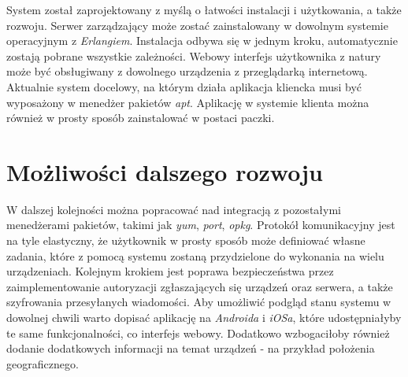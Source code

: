 \documentclass[polish,12pt]{aghthesis}
\begin{document}
System został zaprojektowany z myślą o łatwości instalacji i użytkowania, a także rozwoju. Serwer zarządzający może zostać zainstalowany w dowolnym systemie operacyjnym z \emph{Erlangiem}. Instalacja odbywa się w jednym kroku, automatycznie zostają pobrane wszystkie zależności. Webowy interfejs użytkownika z natury może być obsługiwany z dowolnego urządzenia z przeglądarką internetową. Aktualnie system docelowy, na którym działa aplikacja kliencka musi być wyposażony w menedżer pakietów \emph{apt}. Aplikację w systemie klienta można również w prosty sposób zainstalować w postaci paczki.

\section{Możliwości dalszego rozwoju}
W dalszej kolejności można popracować nad integracją z pozostałymi menedżerami pakietów, takimi jak \emph{yum}, \emph{port}, \emph{opkg}. Protokół komunikacyjny jest na tyle elastyczny, że użytkownik w prosty sposób może definiować własne zadania, które z pomocą systemu zostaną przydzielone do wykonania na wielu urządzeniach. Kolejnym krokiem jest poprawa bezpieczeństwa przez zaimplementowanie autoryzacji zgłaszających się urządzeń oraz serwera, a także szyfrowania przesyłanych wiadomości. Aby umożliwić podgląd stanu systemu w dowolnej chwili warto dopisać aplikację na \emph{Androida} i \emph{iOSa}, które udostępniałyby te same funkcjonalności, co interfejs webowy. Dodatkowo wzbogaciłoby również dodanie dodatkowych informacji na temat urządzeń - na przykład położenia geograficznego.
\end{document}
